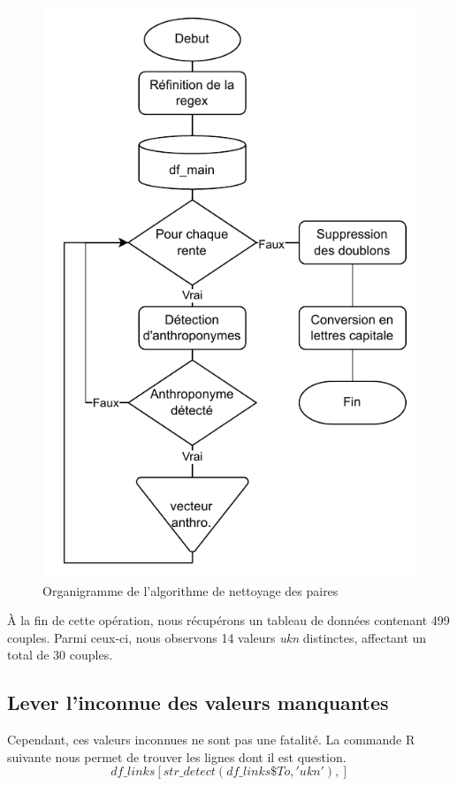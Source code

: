  \begin{figure} %
    \centering
    \includegraphics[scale=0.75]{3.Results/Img/clean_df_links.drawio.pdf}
    \caption{Organigramme de l'algorithme de nettoyage des paires}
    \label{schemaNettoyageRelations}
\end{figure}
 
 À la fin de cette opération, nous récupérons  un tableau de données contenant 499 couples. Parmi ceux-ci, nous observons 14 valeurs \textit{ukn} distinctes, affectant un total de 30 couples.

\subsection{Lever l'inconnue des valeurs manquantes}
Cependant, ces valeurs inconnues ne sont pas une fatalité. La commande R suivante nous permet de trouver les lignes dont il est question.
\[ df\_links[str\_detect(df\_links\$To,'ukn'),]\]
 
